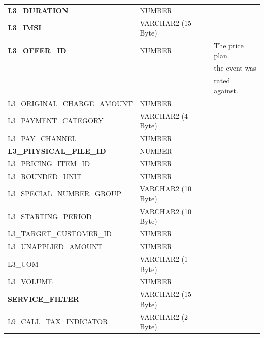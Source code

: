 \documentclass[12pt,twoside]{article}
\begin{document}
\begin{longtable}{lll}
 \textbf{L3\_DURATION}                   &  NUMBER               &                            \\
 \textbf{L3\_IMSI}                       &  VARCHAR2 (15 Byte)   &                            \\
 \textbf{L3\_OFFER\_ID}                  &  NUMBER               &  The price plan            \\
                                         &                       &  the event was             \\
                                         &                       &  rated against.            \\
 L3\_ORIGINAL\_CHARGE\_AMOUNT            &  NUMBER               &                            \\
 L3\_PAYMENT\_CATEGORY                   &  VARCHAR2 (4 Byte)    &                            \\
 L3\_PAY\_CHANNEL                        &  NUMBER               &                            \\
 \textbf{L3\_PHYSICAL\_FILE\_ID}         &  NUMBER               &                            \\
 L3\_PRICING\_ITEM\_ID                   &  NUMBER               &                            \\
 L3\_ROUNDED\_UNIT                       &  NUMBER               &                            \\
 L3\_SPECIAL\_NUMBER\_GROUP              &  VARCHAR2 (10 Byte)   &                            \\
 L3\_STARTING\_PERIOD                    &  VARCHAR2 (10 Byte)   &                            \\
 L3\_TARGET\_CUSTOMER\_ID                &  NUMBER               &                            \\
 L3\_UNAPPLIED\_AMOUNT                   &  NUMBER               &                            \\
 L3\_UOM                                 &  VARCHAR2 (1 Byte)    &                            \\
 L3\_VOLUME                              &  NUMBER               &                            \\
 \textbf{SERVICE\_FILTER}                &  VARCHAR2 (15 Byte)   &                            \\
 L9\_CALL\_TAX\_INDICATOR                &  VARCHAR2 (2 Byte)    &                            \\

\end{longtable}
\end{document}
